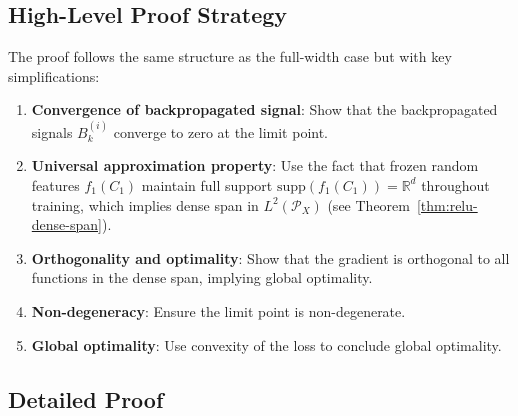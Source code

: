 \documentclass[11pt]{article}
\newcommand{\R}{\mathbb{R}}
\newcommand{\1}{\mathbbm{1}}
\begin{document}
\subsection{High-Level Proof Strategy}

The proof follows the same structure as the full-width case but with key simplifications:

\begin{enumerate}
\item \textbf{Convergence of backpropagated signal}: Show that the backpropagated signals $B_k^{(i)}$ converge to zero at the limit point.

\item \textbf{Universal approximation property}: Use the fact that frozen random features $f_1(C_1)$ maintain full support $\text{supp}(f_1(C_1)) = \R^d$ throughout training, which implies dense span in $L^2(\mathcal{P}_X)$ (see Theorem~\ref{thm:relu-dense-span}).

\item \textbf{Orthogonality and optimality}: Show that the gradient is orthogonal to all functions in the dense span, implying global optimality.

\item \textbf{Non-degeneracy}: Ensure the limit point is non-degenerate.

\item \textbf{Global optimality}: Use convexity of the loss to conclude global optimality.
\end{enumerate}

\subsection{Detailed Proof}
\end{document}
